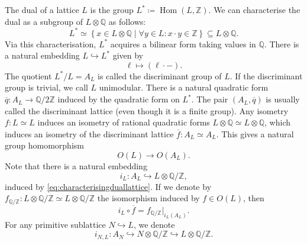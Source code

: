 \documentclass[11pt,twoside]{amsart}
\numberwithin{equation}{section}
\theoremstyle{definition}
\theoremstyle{plain}
\newcommand{\Z}{\ensuremath{\mathbb{Z}}}
\newcommand{\Q}{\ensuremath{\mathbb{Q}}}
\begin{document}
The dual of a lattice $L$ is the group $L^*\coloneqq\operatorname{Hom}(L,\Z)$. We can characterise the dual as a subgroup of $L\otimes \Q$ as follows:
\begin{equation}\label{eq:characterisingduallattice}
L^* \simeq \left\{x\in L\otimes \Q\mid \forall y\in L: x\cdot y\in \Z \right\} \subseteq L\otimes \Q.
\end{equation}
Via this characterisation, $L^*$ acquires a bilinear form taking values in $\Q$. 
There is a natural embedding $L\hookrightarrow L^*$ given by $$\ell\mapsto (\ell\cdot-).$$
The quotient $L^*/L = A_L$ is called the discriminant group of $L$. 
If the discriminant group is trivial, we call $L$ unimodular.
There is a natural quadratic form 
$\overline{q}: A_L\rightarrow \Q/2\Z$ induced by the quadratic form on $L^*$. The pair $(A_{L},\overline{q})$ is usually called the discriminant lattice (even though it is a finite group).
Any isometry $f: L\simeq L$ induces an isometry of rational quadratic forms $L\otimes \Q\simeq L\otimes \Q$, which induces an isometry of the discriminant lattice $\overline{f}:A_{L}\simeq A_{L}$. This gives a natural group homomorphism $$O(L)\to O(A_L).$$
Note that there is a natural embedding \begin{equation}\label{eq:discriminantembedding}
i_L:A_L\hookrightarrow L\otimes \Q/\Z,
\end{equation} induced by \eqref{eq:characterisingduallattice}. If we denote by $f_{\Q/\Z}:L\otimes\Q/\Z\simeq L\otimes \Q/\Z$ the isomorphism induced by $f\in O(L)$, then $$i_L\circ \overline{f} = f_{\Q/\Z}|_{i_L(A_L)}.$$ For any primitive sublattice $N\hookrightarrow L$, we denote $$i_{N,L}:A_N\hookrightarrow N\otimes \Q/\Z\hookrightarrow L\otimes \Q/\Z.$$ 
\end{document}
